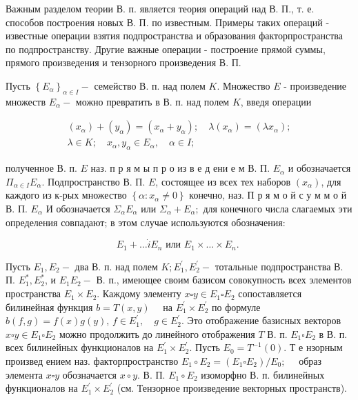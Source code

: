 \documentclass[10pt]{article}
\begin{document}
Важным разделом теории В. п. является теория операций над В. П., т. е. способов построения новых В. П. по известным. Примеры таких операций - известные операции взятия подпространства и образования факторпространства по подпространству. Другие важные операции - построение прямой суммы, прямого произведения и тензорного произведения В. П.



Пусть $\left\{E_{\alpha}\right\}_{\alpha \in I}-$ семейство В. п. над полем $K$. Множество $E$ - произведение множеств $E_{\alpha}-$ можно превратить в В. п. над полем $K$, введя операции



\[

\begin{gathered}

\left(x_{\alpha}\right)+\left(y_{\alpha}\right)=\left(x_{\alpha}+y_{\alpha}\right) ; \quad \lambda\left(x_{\alpha}\right)=\left(\lambda x_{\alpha}\right) ; \\

\lambda \in K ; \quad x_{\alpha}, y_{\alpha} \in E_{\alpha}, \quad \alpha \in I ;

\end{gathered}

\]



полученное В. п. $E$ наз. п р я м ы п р о из в е д ени е м В. П. $E_{\alpha}$ и обозначается $\Pi_{\alpha \in I} E_{\alpha}$. Подпространство В. П. $E$, состоящее из всех тех наборов $\left(x_{\alpha}\right)$, для каждого из к-рых множество $\left\{\alpha: x_{\alpha} \neq 0\right\}$ конечно, наз. П р я м о й с у м м о й В. П. $E_{\alpha}$ И обозначается $\Sigma_{\alpha} E_{\alpha}$ или $\Sigma_{\alpha}+E_{\alpha} ;$ для конечного числа слагаемых эти определения совпадают; в этом случае используются обозначения:



\[

E_{1}+\ldots \dot{i} E_{n} \text { или } E_{1} \times \ldots \times E_{n} \text {. }

\]



Пусть $E_{1}, E_{2}-$ два В. п. над полем $K ; E_{1}^{\prime}, E_{2}^{\prime}-$ тотальные подпространства В. П. $E_{1}^{*}, E_{2}^{*}$, и $E_{1} E_{2}-$ В. п., имеющее своим базисом совокупность всех элементов пространства $E_{1} \times E_{2}$. Каждому элементу $x \square y \in E_{1} \square E_{2}$ сопоставляется билинейная функция $b=T(x, y) \quad$ на $E_{1}^{\prime} \times E_{2}^{\prime}$ по формуле $b(f, g)=f(x) g(y)$, $f \in E_{1}^{\prime}, \quad g \in E_{2}^{\prime}$. Это отображение базисных векторов $x \square y \in E_{1} \square E_{2}$ можно продолжить до линейного отображения $T$ В. п. $E_{1} \square E_{2}$ в В. п. всех билинейных функционалов на $E_{1}^{\prime} \times E_{2}^{\prime}$. Пусть $E_{0}=T^{-1}(0)$. Т е нзорным произвед ением наз. факторпространство $E_{1} \circ E_{2}=\left(E_{1} \square E_{2}\right) / E_{0} ; \quad$ образ элемента $x \square y$ обозначается $x \circ y$. В. П. $E_{1} \circ E_{2}$ изоморфно В. п. билинейных функционалов на $E_{1}^{\prime} \times E_{2}^{\prime}$ (см. Тензорное произведение векторных пространств).
\end{document}
